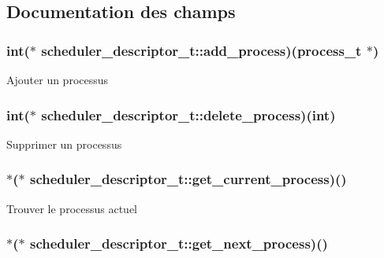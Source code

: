 \subsection{\-Documentation des champs}
\hypertarget{structscheduler__descriptor__t_a8919a05ae907a4b642563078a28e744a}{
\subsubsection[{add\-\_\-process}]{\setlength{\rightskip}{0pt plus 5cm}int($\ast$ {\bf scheduler\-\_\-descriptor\-\_\-t\-::add\-\_\-process})({\bf process\-\_\-t} $\ast$)}}\label{structscheduler__descriptor__t_a8919a05ae907a4b642563078a28e744a}
\-Ajouter un processus \hypertarget{structscheduler__descriptor__t_a656d41ddd8d861d0ee55523de3693dfa}{
\subsubsection[{delete\-\_\-process}]{\setlength{\rightskip}{0pt plus 5cm}int($\ast$ {\bf scheduler\-\_\-descriptor\-\_\-t\-::delete\-\_\-process})(int)}}\label{structscheduler__descriptor__t_a656d41ddd8d861d0ee55523de3693dfa}
\-Supprimer un processus \hypertarget{structscheduler__descriptor__t_a077b3b95ecf49c9dacc40b6a87cb1008}{
\subsubsection[{get\-\_\-current\-\_\-process}]{$\ast$($\ast$ {\bf scheduler\-\_\-descriptor\-\_\-t\-::get\-\_\-current\-\_\-process})()}}\label{structscheduler__descriptor__t_a077b3b95ecf49c9dacc40b6a87cb1008}
\-Trouver le processus actuel \hypertarget{structscheduler__descriptor__t_a41661a5080062b563df01dfb1a02e22e}{
\subsubsection[{get\-\_\-next\-\_\-process}]{$\ast$($\ast$ {\bf scheduler\-\_\-descriptor\-\_\-t\-::get\-\_\-next\-\_\-process})()}}\label{structscheduler__descriptor__t_a41661a5080062b563df01dfb1a02e22e}
